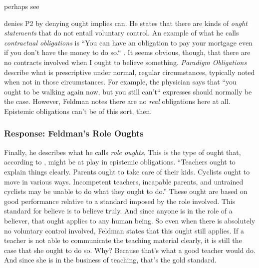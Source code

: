 \documentclass[12pt,numbers=noenddot]{scrartcl}
\begin{document}
perhaps see \textcite{Kruse2001}

\textcite{Feldman2001-FELVBA} denies P2 by denying ought implies can. He states that there are kinds of \emph{ought statements} that do not entail voluntary control. An example of what he calls \emph{contractual obligations} is “You can have an obligation to pay your mortgage even if you don't have the money to do so.“ \autocite[674]{Feldman2000-FELTEO-2}. It seems obvious, though, that there are no contracts involved when I ought to believe something. \emph{Paradigm Obligations} describe what is prescriptive under normal, regular circumstances, typically noted when not in those circumstances. For example, the physician says that “you ought to be walking again now, but you still can't“ \autocite[675]{Feldman2000-FELTEO-2} expresses should normally be the case. However, Feldman notes there are no \emph{real} obligations here at all. Epistemic obligations can't be of this sort, then. 

\subsubsection{Response: Feldman's Role Oughts}

Finally, he describes what he calls \emph{role oughts}. This is the type of ought that, according to \textcite[676]{Feldman2001-FELVBA}, might be at play in epistemic obligations. “Teachers ought to explain things clearly. Parents ought to take care of their kids. Cyclists ought to move in various ways. Incompetent teachers, incapable parents, and untrained cyclists may be unable to do what they ought to do.” These ought are based on good performance relative to a standard imposed by the role involved. This standard for believe is to believe truly. And since anyone is in the role of a believer, that ought applies to any human being. So even when there is absolutely no voluntary control involved, Feldman states that this ought still applies. If a teacher is not able to communicate the teaching material clearly, it is still the case that she ought to do so. Why? Because that's what a good teacher would do. And since she is in the business of teaching, that's the gold standard.
\end{document}
